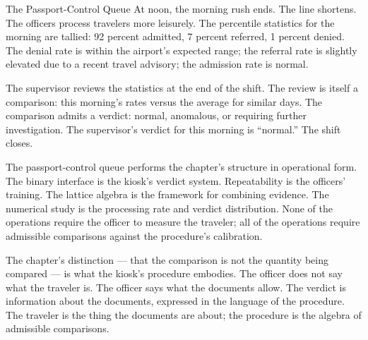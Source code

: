 \begin{coda}{The Passport-Control Queue}
At noon, the morning rush ends. The line shortens. The officers
process travelers more leisurely. The percentile statistics for
the morning are tallied: 92 percent admitted, 7 percent referred,
1 percent denied. The denial rate is within the airport's expected
range; the referral rate is slightly elevated due to a recent
travel advisory; the admission rate is normal.

The supervisor reviews the statistics at the end of the shift. The
review is itself a comparison: this morning's rates versus the
average for similar days. The comparison admits a verdict: normal,
anomalous, or requiring further investigation. The supervisor's
verdict for this morning is ``normal.'' The shift closes.

The passport-control queue performs the chapter's structure in
operational form. The binary interface is the kiosk's verdict
system. Repeatability is the officers' training. The lattice
algebra is the framework for combining evidence. The numerical
study is the processing rate and verdict distribution. None of the
operations require the officer to measure the traveler; all of the
operations require admissible comparisons against the procedure's
calibration.

The chapter's distinction --- that the comparison is not the
quantity being compared --- is what the kiosk's procedure
embodies. The officer does not say what the traveler is. The
officer says what the documents allow. The verdict is information
about the documents, expressed in the language of the procedure.
The traveler is the thing the documents are about; the procedure
is the algebra of admissible comparisons.

\end{coda}
